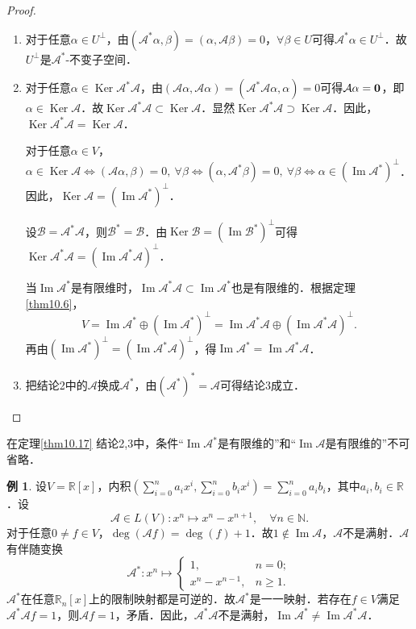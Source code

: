 \documentclass[a4paper,fontset=windows]{ctexbook}
\theoremstyle{definition}
\newtheorem{example}{例}[chapter]
\DeclareMathOperator{\im}{Im}
\DeclareMathOperator{\Ker}{Ker}
\def\note{\noindent\raisebox{10pt}{\dbend}\hspace{7pt}}
\renewcommand{\ge}{\geqslant}
\begin{document}
\begin{proof}~
\begin{enumerate}
\item 对于任意$\alpha\in U^\perp$，由$(\mathcal{A}^*\alpha,\beta)=(\alpha,\mathcal{A}\beta)=0$，$\forall\beta\in U$可得$\mathcal{A}^*\alpha\in U^\perp$．故$U^\perp$是$\mathcal{A}^*$-不变子空间．

\item 对于任意$\alpha\in\Ker\mathcal{A^*A}$，由$(\mathcal{A}\alpha,\mathcal{A}\alpha)=(\mathcal{A}^*\mathcal{A}\alpha,\alpha)=0$可得$\mathcal{A}\alpha={\bf 0}$，即$\alpha\in\Ker\mathcal{A}$．故$\Ker\mathcal{A}^*\mathcal{A}\subset\Ker\mathcal{A}$．显然$\Ker\mathcal{A^*A}\supset\Ker\mathcal{A}$．因此，$\Ker\mathcal{A^*A}=\Ker\mathcal{A}$．

对于任意$\alpha\in V$，$\alpha\in\Ker\mathcal{A}\Leftrightarrow(\mathcal{A}\alpha,\beta)=0,~\forall\beta\Leftrightarrow(\alpha,\mathcal{A}^*\beta)=0,~\forall\beta\Leftrightarrow\alpha\in(\im\mathcal{A}^*)^\perp$．因此，$\Ker\mathcal{A}=(\im\mathcal{A}^*)^\perp$．

设$\mathcal{B=A^*A}$，则$\mathcal{B}^*=\mathcal{B}$．由$\Ker\mathcal{B}=(\im\mathcal{B}^*)^\perp$可得$\Ker\mathcal{A^*A}=(\im\mathcal{A^*A})^\perp$．

当$\im\mathcal{A}^*$是有限维时，$\im\mathcal{A}^*\mathcal{A}\subset\im\mathcal{A}^*$也是有限维的．根据定理\ref{thm10.6}，
$$V=\im\mathcal{A}^*\oplus(\im\mathcal{A}^*)^\perp=\im\mathcal{A}^*\mathcal{A}\oplus(\im\mathcal{A}^*\mathcal{A})^\perp.$$
再由$(\im\mathcal{A}^*)^\perp=(\im\mathcal{A^*A})^\perp$，得$\im\mathcal{A}^*=\im\mathcal{A}^*\mathcal{A}$．

\item 把结论2中的$\mathcal{A}$换成$\mathcal{A}^*$，由$(\mathcal{A}^*)^*=\mathcal{A}$可得结论3成立．\qedhere
\end{enumerate}
\end{proof}

\note 在定理\ref{thm10.17} 结论2,3中，条件“$\im\mathcal{A}^*$是有限维的”和“$\im\mathcal{A}$是有限维的”不可省略．

\begin{example}
设$V=\mathbb{R}[x]$，内积$\left(\sum\limits_{i=0}^na_ix^i,\sum\limits_{i=0}^nb_ix^i\right)=\sum\limits_{i=0}^na_ib_i$，其中$a_i,b_i\in\mathbb{R}$．设
$$\mathcal{A}\in L(V):x^n\mapsto x^n-x^{n+1},\quad\forall n\in\mathbb{N}.$$
对于任意$0\ne f\in V$，$\deg(\mathcal{A}f)=\deg(f)+1$．故$1\notin\im\mathcal{A}$，$\mathcal{A}$不是满射．$\mathcal{A}$有伴随变换
$$\mathcal{A}^*:x^n\mapsto\begin{cases}1,&n=0; \\ x^n-x^{n-1},&n\ge 1.\end{cases}$$
$\mathcal{A}^*$在任意$\mathbb{R}_n[x]$上的限制映射都是可逆的．故$\mathcal{A}^*$是一一映射．若存在$f\in V$满足$\mathcal{A^*A}f=1$，则$\mathcal{A}f=1$，矛盾．因此，$\mathcal{A}^*\mathcal{A}$不是满射，$\im\mathcal{A}^*\ne\im\mathcal{A}^*\mathcal{A}$．
\end{example}
\end{document}
